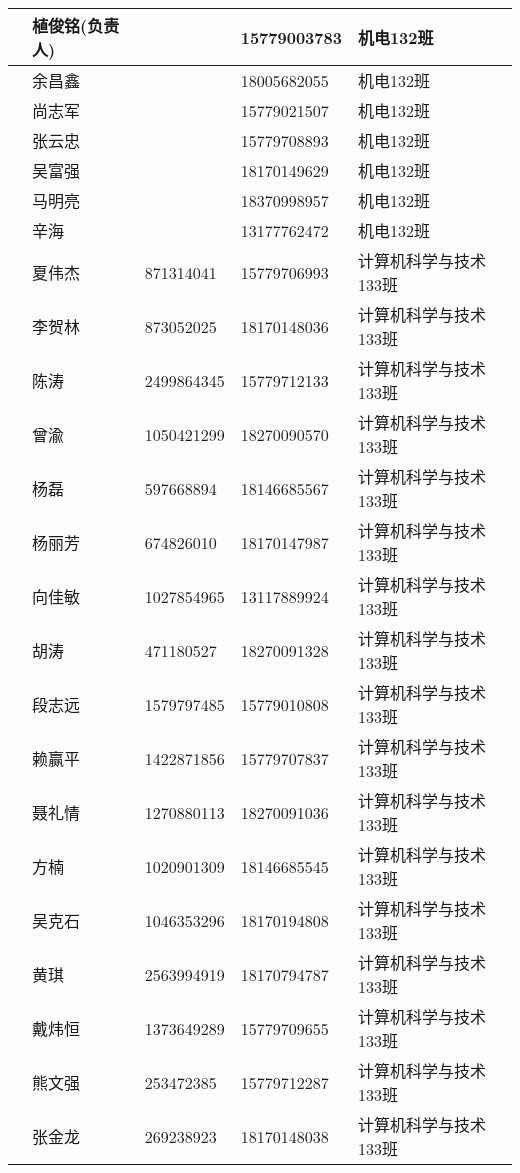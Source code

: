 \documentclass[12pt,a4paper]{article}
\begin{document}
\begin{CJK}{UTF8}{gbsn}
\begin{flushleft}
\begin{longtable}{|l|l|l|l|l|}
 & 植俊铭(负责人) & & 15779003783 & 机电132班  \\ \hline
 & 余昌鑫 &  & 18005682055 & 机电132班 \\ \hline
 & 尚志军 &  & 15779021507 & 机电132班 \\ \hline
 & 张云忠 &  & 15779708893 & 机电132班 \\ \hline
 & 吴富强 &  & 18170149629 & 机电132班 \\ \hline
 & 马明亮 &  & 18370998957 & 机电132班 \\ \hline
 & 辛海   &  & 13177762472 & 机电132班 \\ \hline



     & 夏伟杰 & 871314041  & 15779706993 & 计算机科学与技术133班 \\ \hline
     & 李贺林 & 873052025  & 18170148036 & 计算机科学与技术133班 \\ \hline
     & 陈涛   & 2499864345 & 15779712133 & 计算机科学与技术133班 \\ \hline
     & 曾渝   & 1050421299 & 18270090570 & 计算机科学与技术133班 \\ \hline
     & 杨磊   & 597668894  & 18146685567 & 计算机科学与技术133班 \\ \hline
     & 杨丽芳 & 674826010  & 18170147987 & 计算机科学与技术133班 \\ \hline
     & 向佳敏 & 1027854965 & 13117889924 & 计算机科学与技术133班 \\ \hline
     & 胡涛   & 471180527  & 18270091328 & 计算机科学与技术133班 \\ \hline
     & 段志远 & 1579797485 & 15779010808 & 计算机科学与技术133班 \\ \hline
     & 赖赢平 & 1422871856 & 15779707837 & 计算机科学与技术133班 \\ \hline
     & 聂礼情 & 1270880113 & 18270091036 & 计算机科学与技术133班 \\ \hline
     & 方楠   & 1020901309 & 18146685545 & 计算机科学与技术133班 \\ \hline
     & 吴克石 & 1046353296 & 18170194808 & 计算机科学与技术133班 \\ \hline
     & 黄琪   & 2563994919 & 18170794787 & 计算机科学与技术133班 \\ \hline
     & 戴炜恒 & 1373649289 & 15779709655 & 计算机科学与技术133班 \\ \hline
     & 熊文强 & 253472385  & 15779712287 & 计算机科学与技术133班 \\ \hline
     & 张金龙 & 269238923  & 18170148038 & 计算机科学与技术133班 \\ \hline

\end{longtable}
\end{flushleft}
\end{CJK}
\end{document}
